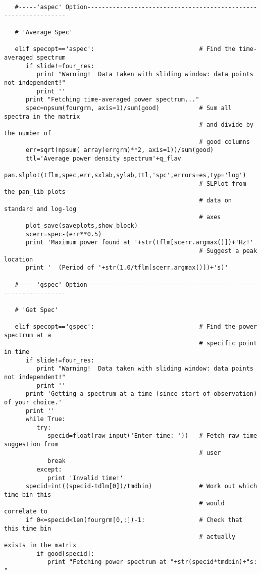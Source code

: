\begin{verbatim}
   #-----'aspec' Option----------------------------------------------------------------

   # 'Average Spec'

   elif specopt=='aspec':                             # Find the time-averaged spectrum
      if slide!=four_res:
         print "Warning!  Data taken with sliding window: data points not independent!"
         print ''
      print "Fetching time-averaged power spectrum..."
      spec=npsum(fourgrm, axis=1)/sum(good)           # Sum all spectra in the matrix
                                                      # and divide by the number of
                                                      # good columns
      err=sqrt(npsum( array(errgrm)**2, axis=1))/sum(good)
      ttl='Average power density spectrum'+q_flav
      pan.slplot(tflm,spec,err,sxlab,sylab,ttl,'spc',errors=es,typ='log')
                                                      # SLPlot from the pan_lib plots
                                                      # data on standard and log-log
                                                      # axes
      plot_save(saveplots,show_block)      
      scerr=spec-(err**0.5)
      print 'Maximum power found at '+str(tflm[scerr.argmax()])+'Hz!'
                                                      # Suggest a peak location
      print '  (Period of '+str(1.0/tflm[scerr.argmax()])+'s)'

   #-----'gspec' Option----------------------------------------------------------------
   
   # 'Get Spec'
   
   elif specopt=='gspec':                             # Find the power spectrum at a
                                                      # specific point in time
      if slide!=four_res:
         print "Warning!  Data taken with sliding window: data points not independent!"
         print ''
      print 'Getting a spectrum at a time (since start of observation) of your choice.'
      print ''
      while True:
         try:
            specid=float(raw_input('Enter time: '))   # Fetch raw time suggestion from
                                                      # user
            break
         except:
            print 'Invalid time!'
      specid=int((specid-tdlm[0])/tmdbin)             # Work out which time bin this
                                                      # would correlate to
      if 0<=specid<len(fourgrm[0,:])-1:               # Check that this time bin
                                                      # actually exists in the matrix
         if good[specid]:
            print "Fetching power spectrum at "+str(specid*tmdbin)+"s: "


\end{verbatim}
